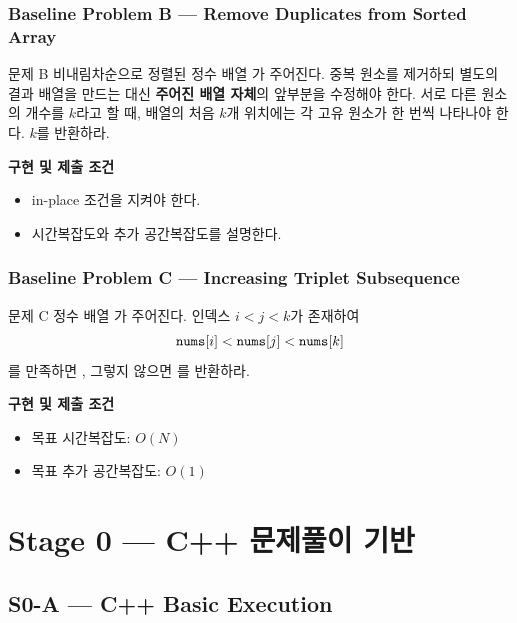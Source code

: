 \section{Baseline Problem B --- Remove Duplicates from Sorted Array}
\begin{problembox}{문제 B}
비내림차순으로 정렬된 정수 배열 가 주어진다. 중복 원소를 제거하되 별도의 결과 배열을 만드는 대신 \textbf{주어진 배열 자체}의 앞부분을 수정해야 한다. 서로 다른 원소의 개수를 $k$라고 할 때, 배열의 처음 $k$개 위치에는 각 고유 원소가 한 번씩 나타나야 한다. $k$를 반환하라.

\textbf{구현 및 제출 조건}
\begin{itemize}
  \item in-place 조건을 지켜야 한다.
  \item 시간복잡도와 추가 공간복잡도를 설명한다.
\end{itemize}
\end{problembox}

\section{Baseline Problem C --- Increasing Triplet Subsequence}
\begin{problembox}{문제 C}
정수 배열 가 주어진다. 인덱스 $i<j<k$가 존재하여
\[
\texttt{nums}[i] < \texttt{nums}[j] < \texttt{nums}[k]
\]
를 만족하면 , 그렇지 않으면 를 반환하라.

\textbf{구현 및 제출 조건}
\begin{itemize}
  \item 목표 시간복잡도: $O(N)$
  \item 목표 추가 공간복잡도: $O(1)$
\end{itemize}
\end{problembox}

\part{Stage 0 --- C++ 문제풀이 기반}
\chapter{S0-A --- C++ Basic Execution}

